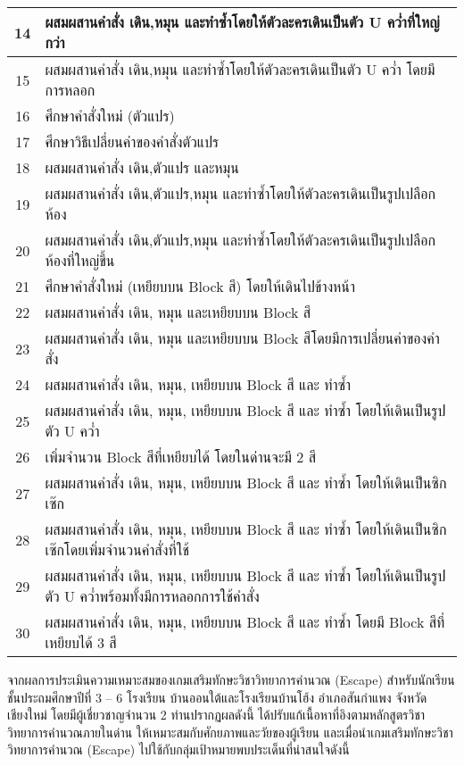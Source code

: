 \begin{center}
\begin{tabular}{|c | m{35em}|}
     \hline
     14 &  ผสมผสานคำสั่ง เดิน,หมุน และทำซ้ำโดยให้ตัวละครเดินเป็นตัว U คว่ำที่ใหญ่กว่า \\ 
     \hline
     15 &  ผสมผสานคำสั่ง เดิน,หมุน และทำซ้ำโดยให้ตัวละครเดินเป็นตัว U คว่ำ โดยมีการหลอก \\ 
     \hline
     16 &  ศึกษาคำสั่งใหม่ (ตัวแปร) \\ 
     \hline
     17 &  ศึกษาวิธีเปลี่ยนค่าของคำสั่งตัวแปร \\ 
     \hline
     18 &  ผสมผสานคำสั่ง เดิน,ตัวแปร และหมุน \\ 
     \hline
     19 &  ผสมผสานคำสั่ง เดิน,ตัวแปร,หมุน และทำซ้ำโดยให้ตัวละครเดินเป็นรูปเปลือกห้อง \\ 
     \hline
     20 &  ผสมผสานคำสั่ง เดิน,ตัวแปร,หมุน และทำซ้ำโดยให้ตัวละครเดินเป็นรูปเปลือกห้องที่ใหญ่ขึ้น \\ 
     \hline
     21 &  ศึกษาคำสั่งใหม่ (เหยียบบน Block สี) โดยให้เดินไปข้างหน้า \\ 
     \hline
     22 &  ผสมผสานคำสั่ง เดิน, หมุน และเหยียบบน Block สี \\ 
     \hline
     23 &  ผสมผสานคำสั่ง เดิน, หมุน และเหยียบบน Block สีโดยมีการเปลี่ยนค่าของคำสั่ง \\ 
     \hline
     24 &  ผสมผสานคำสั่ง เดิน, หมุน, เหยียบบน Block สี และ ทำซ้ำ \\ 
     \hline
     25 &  ผสมผสานคำสั่ง เดิน, หมุน, เหยียบบน Block สี และ ทำซ้ำ โดยให้เดินเป็นรูปตัว U คว่ำ \\ 
     \hline
     26 &  เพิ่มจำนวน Block สีที่เหยียบได้ โดยในด่านจะมี 2 สี \\ 
     \hline
     27 &  ผสมผสานคำสั่ง เดิน, หมุน, เหยียบบน Block สี และ ทำซ้ำ โดยให้เดินเป็นซิกเซ๊ก \\ 
     \hline
     28 &  ผสมผสานคำสั่ง เดิน, หมุน, เหยียบบน Block สี และ ทำซ้ำ โดยให้เดินเป็นซิกเซ๊กโดยเพิ่มจำนวนคำสั่งที่ใช้ \\ 
     \hline
     29 &  ผสมผสานคำสั่ง เดิน, หมุน, เหยียบบน Block สี และ ทำซ้ำ โดยให้เดินเป็นรูปตัว U คว่ำพร้อมทั้งมีการหลอกการใช้คำสั่ง \\ 
     \hline
     30 &  ผสมผสานคำสั่ง เดิน, หมุน, เหยียบบน Block สี และ ทำซ้ำ โดยมี Block สีที่เหยียบได้ 3 สี \\ 
     \hline
    \end{tabular}
\end{center}

จากผลการประเมินความเหมาะสมของเกมเสริมทักษะวิชาวิทยาการคำนวณ (Escape) สำหรับนักเรียนชั้นประถมศึกษาปีที่ 
3 – 6 โรงเรียน บ้านออนใต้และโรงเรียนบ้านโฮ้ง อำเภอสันกำแพง จังหวัดเชียงใหม่ 
โดยมีผู้เชี่ยวชาญจำนวน 2 ท่านปรากฏผลดังนี้ ได้ปรับแก้เนื้อหาที่อิงตามหลักสูตรวิชาวิทยาการคำนวณภายในด่าน 
ให้เหมาะสมกับศักยภาพและวัยของผู้เรียน และเมื่อนำเกมเสริมทักษะวิชาวิทยาการคำนวณ (Escape) 
ไปใช้กับกลุ่มเป้าหมายพบประเด็นที่น่าสนใจดังนี้

